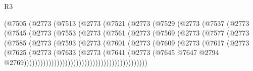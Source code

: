 \begin{lexlean}{R3}
\begin{coremodule}
                    (@7505
                      (@2773
                        (@7513
                          (@2773
                            (@7521
                              (@2773
                                (@7529
                                  (@2773
                                    (@7537
                                      (@2773
                                        (@7545
                                          (@2773
                                            (@7553
                                              (@2773
                                                (@7561
                                                  (@2773
                                                    (@7569
                                                      (@2773
                                                        (@7577
                                                          (@2773
                                                            (@7585
                                                              (@2773
                                                                (@7593
                                                                  (@2773
                                                                    (@7601
                                                                      (@2773
                                                                        (@7609
                                                                          (@2773
                                                                            (@7617
                                                                              (@2773
                                                                                (@7625
                                                                                  (@2773
                                                                                    (@7633
                                                                                      (@2773
                                                                                        (@7641
                                                                                          (@2773
                                                                                            (@7645
                                                                                              @7647
                                                                                              @2794
                                                                                              @2769)))))))))))))))))))))))))))))))))))))))))))))

\end{coremodule}
\end{lexlean}
